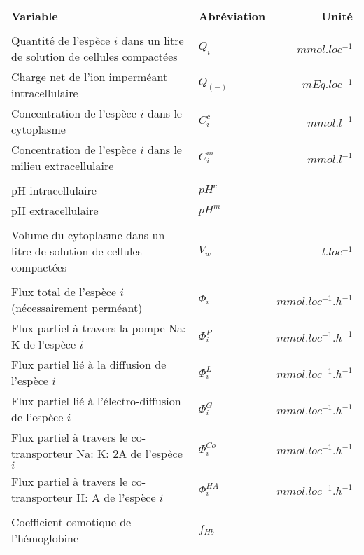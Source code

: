 \documentclass[a4paper,fleqn]{article}
\begin{document}
\begin{tabular}{p{8cm}lr}

\textbf{Variable}                                                      & \textbf{Abréviation}     & \textbf{Unité}      \\
\\
Quantité de l'espèce $i$ dans un litre de solution de cellules compactées  & $Q_i$                    & $mmol.loc^{-1}$     \\
Charge net de l'ion imperméant intracellulaire                         & $Q_{(-)}$               & $mEq.loc^{-1}$      \\
Concentration de l'espèce $i$ dans le cytoplasme                           & $C_{i}^{c}$              & $mmol.l^{-1}$       \\
Concentration de l'espèce $i$ dans le milieu extracellulaire               & $C_{i}^{m}$              & $mmol.l^{-1}$       \\\\

pH intracellulaire                                                     & $pH^c$                                         \\
pH extracellulaire                                                     & $pH^m$                                         \\\\

Volume du cytoplasme dans un litre de solution de cellules compactées & $V_w$                    & $l.loc^{-1}$        \\\\

Flux total de l'espèce $i$ (nécessairement perméant)                       & $\Phi_i$                 & $mmol.loc^{-1}.h^{-1}$\\
Flux partiel à travers la pompe Na: K de l'espèce $i$                      & $\Phi_{i}^{P}$           & $mmol.loc^{-1}.h^{-1}$\\
Flux partiel lié à la diffusion de l'espèce $i$                             & $\Phi_{i}^{L}$           & $mmol.loc^{-1}.h^{-1}$\\
Flux partiel lié à l'électro-diffusion de l'espèce $i$                      & $\Phi_{i}^{G}$           & $mmol.loc^{-1}.h^{-1}$\\
Flux partiel à travers le co-transporteur Na: K: 2A de l'espèce $i$         & $\Phi_{i}^{Co}$          & $mmol.loc^{-1}.h^{-1}$\\
Flux partiel à travers le co-transporteur H: A de l'espèce $i$              & $\Phi_{i}^{HA}$          & $mmol.loc^{-1}.h^{-1}$\\\\

Coefficient osmotique de l'hémoglobine                                 & $f_{Hb}$                                       \\

\end{tabular}\\
\end{document}
